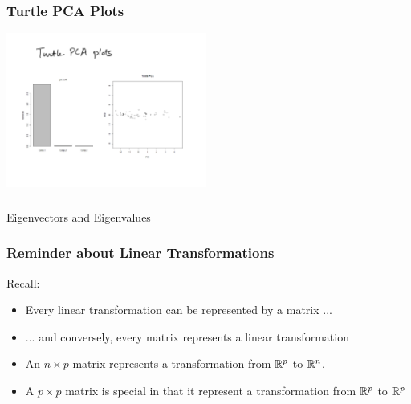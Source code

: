 \documentclass{beamer}
\begin{document}
\begin{frame}
  \frametitle{Turtle PCA Plots}

\begin{center}
\includegraphics[height=2in]{turtle-pca}
\end{center}
\end{frame}




\begin{frame}
  \frametitle{}

\begin{center}
\begin{Huge}
Eigenvectors and Eigenvalues
\end{Huge}
\end{center}
\end{frame}

\begin{frame}
  \frametitle{Reminder about Linear Transformations}

Recall:

\begin{itemize}
\item Every linear transformation can be represented by a matrix ...

\item ... and conversely, every matrix represents a linear transformation

\item An $n \times p$ matrix represents a transformation from $\mathbb{R}^p$ to $\mathbb{R}^n$.

\item A $p \times p$ matrix is special in that it represent a transformation from $\mathbb{R}^p$ to $\mathbb{R}^p$

\end{itemize}


\end{frame}
\end{document}
